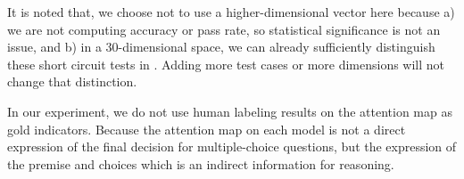 It is noted that, we choose not to use a higher-dimensional vector
here because a) we are not computing accuracy or
pass rate, so statistical significance
is not an issue, and b) in a 30-dimensional space,
we can already sufficiently distinguish these short
circuit tests in . Adding more test cases
or more dimensions will not change that distinction.

In our experiment, we do not use human labeling results on the attention map 
as gold indicators.  Because the attention map on each model is not a direct 
expression of the final decision for multiple-choice questions, 
but the expression of the premise and choices which is an indirect information for reasoning.

\fi


%
%


